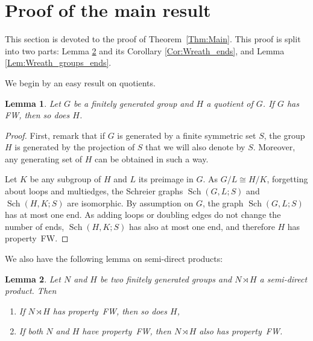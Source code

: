 \documentclass[a4paper]{article}
\newtheorem{lem}{Lemma}[section]
\theoremstyle{definition}
\theoremstyle{remark}
\DeclareMathOperator\Sch{Sch}
\begin{document}
\section{Proof of the main result}
\label{Section:Proof}
%

This section is devoted to the proof of Theorem~\ref{Thm:Main}. This proof is split into two parts: Lemma \ref{Lemma:Semidirect_ends} and its Corollary \ref{Cor:Wreath_ends}, and Lemma \ref{Lem:Wreath_groups_ends}.

We begin by an easy result on quotients.
\begin{lem}\label{Lem:Quotient}
Let $G$ be a finitely generated group and $H$ a quotient of $G$. If $G$ has FW, then so does $H$.
\end{lem}
%
\begin{proof}
First, remark that if $G$ is generated by a finite symmetric set $S$, the group $H$ is generated by the projection of $S$ that we will also denote by $S$.
Moreover, any generating set of $H$ can be obtained in such a way.

Let $K$ be any subgroup of $H$ and $L$ its preimage in $G$.
As $G/L \cong H/K$, forgetting about loops and multiedges, the Schreier graphs $\Sch(G,L;S)$ and $\Sch(H,K;S)$ are isomorphic.
By assumption on $G$, the graph $\Sch(G,L;S)$ has at most one end.
As adding loops or doubling edges do not change the number of ends, $\Sch(H,K;S)$ has also at most one end, and therefore $H$ has property~FW.
\end{proof}
%
%
We also have the following lemma on semi-direct products:
%
%
\begin{lem}\label{Lemma:Semidirect_ends}
Let $N$ and $H$ be two finitely generated groups and $N\rtimes H$ a semi-direct product.
Then
\begin{enumerate}
\item If $N\rtimes H$ has property~FW, then so does $H$,
\item If both $N$ and $H$ have property~FW, then $N\rtimes H$ also has property~FW.
\end{enumerate}
\end{lem}
\end{document}
